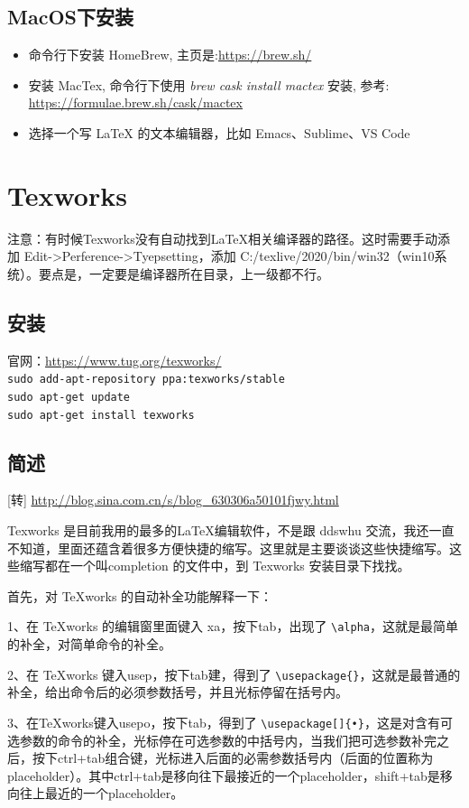 \subsection{MacOS下安装}
\begin{itemize}
\item 命令行下安装 HomeBrew, 主页是:\url{https://brew.sh/}
\item 安装 MacTex, 命令行下使用 \emph{brew cask install mactex} 安装, 参考: \url{https://formulae.brew.sh/cask/mactex}
\item 选择一个写 \LaTeX{} 的文本编辑器，比如 Emacs、Sublime、VS Code
\end{itemize}

\section{Texworks}
注意：有时候Texworks没有自动找到\LaTeX{}相关编译器的路径。这时需要手动添加
Edit->Perference->Tyepsetting，添加
C:/texlive/2020/bin/win32（win10系统）。要点是，一定要是编译器所在目录，上一级都不行。


\subsection{安装}
官网：\url{https://www.tug.org/texworks/}\\
\verb|sudo add-apt-repository ppa:texworks/stable|\\
\verb|sudo apt-get update|\\
\verb|sudo apt-get install texworks|


\subsection{简述}
[转] \url{http://blog.sina.com.cn/s/blog_630306a50101fjwy.html}

Texworks 是目前我用的最多的\LaTeX 编辑软件，不是跟 ddswhu 交流，我还一直不知道，里面还蕴含着很多方便快捷的缩写。这里就是主要谈谈这些快捷缩写。这些缩写都在一个叫completion 的文件中，到 Texworks 安装目录下找找。

首先，对 TeXworks 的自动补全功能解释一下：

1、在 TeXworks 的编辑窗里面键入 xa，按下tab，出现了 \verb|\alpha|，这就是最简单的补全，对简单命令的补全。

2、在 TeXworks 键入usep，按下tab建，得到了 \verb|\usepackage{}|，这就是最普通的补全，给出命令后的必须参数括号，并且光标停留在括号内。

3、在TeXworks键入usepo，按下tab，得到了 \verb|\usepackage[]{•}|，这是对含有可选参数的命令的补全，光标停在可选参数的中括号内，当我们把可选参数补完之后，按下ctrl+tab组合键，光标进入后面的必需参数括号内（后面的位置称为placeholder）。其中ctrl+tab是移向往下最接近的一个placeholder，shift+tab是移向往上最近的一个placeholder。
 
